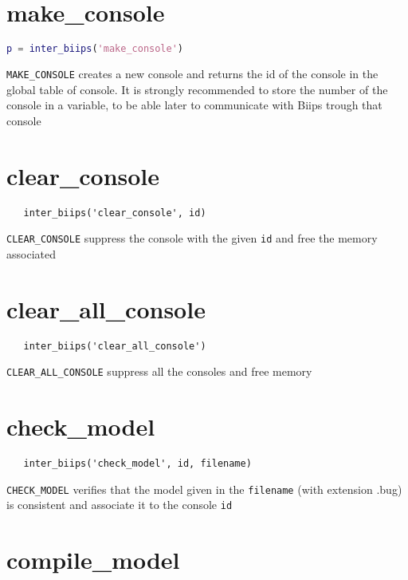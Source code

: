 \documentclass[11pt]{article}
\begin{document}
\section{make\_console}
 \begin{lstlisting}[language=matlab]
   p = inter_biips('make_console')
 \end{lstlisting}
   
   \texttt{MAKE\_CONSOLE}  creates a new console and returns the id of the console in the global table of console. It
   is strongly recommended to store the number of the console in a variable, to be able later to communicate with Biips trough that
   console

\section{clear\_console}

 \begin{lstlisting}
   inter_biips('clear_console', id)
 \end{lstlisting}

  \texttt{CLEAR\_CONSOLE} suppress the console with the given \texttt{id} and free the memory associated

\section{clear\_all\_console}
 
 \begin{lstlisting}
   inter_biips('clear_all_console')
 \end{lstlisting}

  \texttt{CLEAR\_ALL\_CONSOLE} suppress all the consoles and free memory

\section{check\_model}

 \begin{lstlisting}
   inter_biips('check_model', id, filename)
 \end{lstlisting}
  
 \texttt{CHECK\_MODEL} verifies that the model given in the \texttt{filename} (with extension .bug) is consistent and associate it to the console \texttt{id}

\section{compile\_model}
\end{document}

